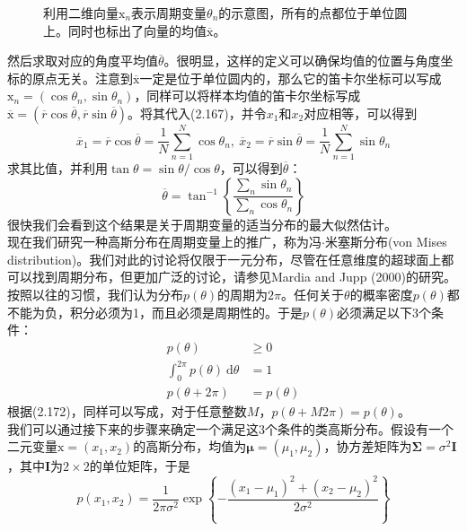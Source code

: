 \documentclass[b5paper]{book}
\numberwithin{equation}{chapter}
\newcommand {\bx} {\boldsymbol{\mathrm{x}}}
\newcommand {\bfMu} {\boldsymbol{\mu}}
\newcommand {\bfSigma} {\boldsymbol{\Sigma}}
\begin{document}
{\begin{figure}[ht]
		\caption{利用二维向量$\bx_n$表示周期变量$\theta_n$的示意图，所有的点都位于单位圆上。同时也标出了向量的均值$\overline{\bx}$。}
		\label{fig:2-17}
	\end{figure}
	然后求取对应的角度平均值$\overline{\theta}$。很明显，这样的定义可以确保均值的位置与角度坐标的原点无关。注意到$\overline{\bx}$一定是位于单位圆内的，那么它的笛卡尔坐标可以写成$\bx_n=(\cos \theta_n, \sin \theta_n)$，同样可以将样本均值的笛卡尔坐标写成$\overline{\bx}=(\overline{r}\cos \overline{\theta}, \overline{r}\sin \overline{\theta})$。将其代入(2.167)，并令$x_1$和$x_2$对应相等，可以得到
	\begin{equation}
		\overline{x}_1=\overline{r}\cos \overline{\theta} = \frac{1}{N}\sum_{n=1}^N \cos\theta_n, \ \overline{x}_2=\overline{r}\sin \overline{\theta} = \frac{1}{N}\sum_{n=1}^N \sin\theta_n
	\end{equation}
	求其比值，并利用$\tan \theta = \sin \theta/ \cos \theta$，可以得到$\overline{\theta}$：
	\begin{equation}
		\overline{\theta}=\tan^{-1}\left\{\frac{\sum_n\sin \theta_n}{\sum_n \cos \theta_n}\right\}
	\end{equation}
	很快我们会看到这个结果是关于周期变量的适当分布的最大似然估计。\\
	\indent 现在我们研究一种高斯分布在周期变量上的推广，称为冯$\cdot$米塞斯分布(von Mises distribution)。我们对此的讨论将仅限于一元分布，尽管在任意维度的超球面上都可以找到周期分布，但更加广泛的讨论，请参见Mardia and Jupp (2000)的研究。\\
	\indent 按照以往的习惯，我们认为分布$p(\theta)$的周期为$2\pi$。任何关于$\theta$的概率密度$p(\theta)$都不能为负，积分必须为1，而且必须是周期性的。于是$p(\theta)$必须满足以下3个条件：
	\begin{align}
		p(\theta)&\geqslant 0 \\
		\int_0^{2\pi} p(\theta) \ \mathrm{d}\theta &= 1 \\
		p(\theta+2\pi)&=p(\theta)
	\end{align}
	根据(2.172)，同样可以写成，对于任意整数$M$，$p(\theta+M2\pi)=p(\theta)$。\\
	\indent 我们可以通过接下来的步骤来确定一个满足这3个条件的类高斯分布。假设有一个二元变量$\bx=(x_1,x_2)$的高斯分布，均值为$\bfMu=(\mu_1,\mu_2)$，协方差矩阵为$\bfSigma=\sigma^2\mathbf{I}$，其中$\mathbf{I}$为$2 \times 2$的单位矩阵，于是
	\begin{equation}
		p(x_1,x_2)=\frac{1}{2\pi \sigma^2}\exp\left\{-\frac{(x_1-\mu_1)^2+(x_2-\mu_2)^2}{2\sigma^2}\right\}
	\end{equation}
}
\end{document}
